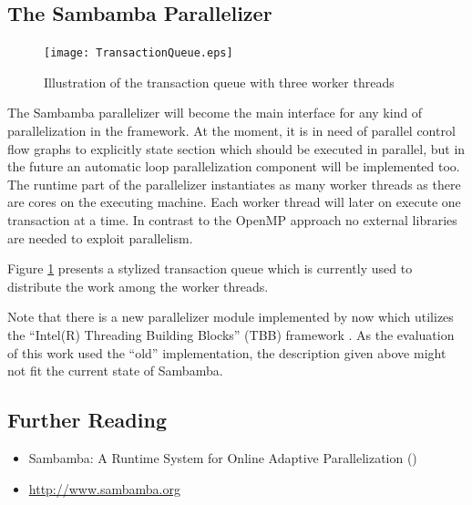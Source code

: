 \subsection{The Sambamba Parallelizer}
\begin{figure}
  \centering
  \vspace*{-0mm}
  \texttt{[image: TransactionQueue.eps]}
  \caption{Illustration of the transaction queue with three worker threads}
  \label{fig:TransactionQueue}  
\end{figure}
The Sambamba parallelizer will become the main interface for any kind of 
parallelization in the framework. At the moment, it is in need of parallel control
flow graphs to explicitly state section which should be executed in parallel, but
in the future an automatic loop parallelization component will be implemented too. 
The runtime part of the parallelizer instantiates as many worker threads as 
there are cores on the executing machine. Each worker thread will later on execute 
one transaction at a time. In contrast to the OpenMP approach
no external libraries are needed to exploit parallelism. 

Figure \ref{fig:TransactionQueue} presents a stylized transaction queue which is
currently used to distribute the work among the worker threads. 

Note that there is a new parallelizer module implemented by now which utilizes
the ``Intel(R) Threading Building Blocks'' (TBB) framework \cite{Corporation_2008}. 
As the evaluation of this work used the ``old'' implementation, the 
description given above might not fit the current state of Sambamba.

\subsection*{Further Reading}
\begin{itemize}
  \item Sambamba: A Runtime System for Online Adaptive Parallelization (\citet{DBLP:conf/cc/StreitHZH12})
  \item \url{http://www.sambamba.org} 
\end{itemize}



